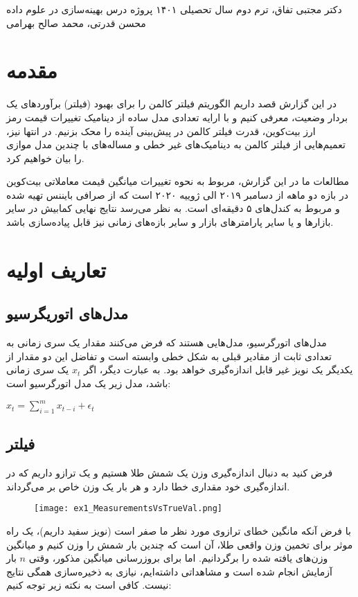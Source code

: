 \documentclass{scribe-cgenomics}
\begin{document}
{دکتر مجتبی تفاق، ترم دوم سال تحصیلی ۱۴۰۱}
{پروژه درس بهینه‌سازی در علوم داده}
{محسن قدرتی، محمد صالح بهرامی}


\section{مقدمه}
در این گزارش قصد داریم الگوریتم فیلتر کالمن را برای بهبود (فیلتر) برآوردهای یک بردار وضعیت، معرفی کنیم و با ارایه تعدادی مدل ساده از دینامیک تغییرات قیمت رمز ارز بیت‌کوین، قدرت فیلتر کالمن در پیش‌بینی آینده را محک بزنیم. در انتها نیز، تعمیم‌هایی از فیلتر کالمن به دینامیک‌های غیر خطی و مساله‌های با چندین مدل موازی را بیان خواهیم کرد. 

مطالعات ما در این گزارش، مربوط به نحوه تغییرات میانگین قیمت معاملاتی بیت‌کوین در بازه دو ماهه از دسامبر ۲۰۱۹ الی ژوییه ۲۰۲۰ است که از صرافی بایننس تهیه شده و مربوط به کندل‌های ۵ دقیقه‌ای است. به نظر می‌رسد نتایج نهایی کمابیش در سایر بازارها و یا سایر پارامترهای بازار و سایر بازه‌های زمانی نیز قابل پیاده‌سازی باشد.

\section{تعاریف اولیه}
\subsection{مدل‌های اتوریگرسیو}
مدل‌های اتورگرسیو، مدل‌هایی هستند که فرض می‌کنند مقدار یک سری زمانی به تعدادی ثابت از مقادیر قبلی به شکل خطی وابسته است و تفاضل این دو مقدار از یکدیگر یک نویز غیر قابل اندازه‌گیری خواهد بود. به عبارت دیگر، اگر
$x_t$
یک سری زمانی باشد، مدل زیر یک مدل اتورگرسیو است:

\begin{center}
$
x_t = \sum_{i = 1}^{m}x_{t-i} + \epsilon_t
$
\end{center}


\subsection{فیلتر}
فرض کنید به دنبال اندازه‌گیری وزن یک شمش طلا هستیم و یک ترازو داریم که در اندازه‌گیری خود مقداری خطا دارد و هر بار یک وزن خاص بر می‌گرداند.

\begin{figure}[h]
\texttt{[image: ex1\_MeasurementsVsTrueVal.png]}
\centering
\end{figure}

با فرض آنکه مانگین خطای ترازوی مورد نظر ما صفر است (نویز سفید داریم)، یک راه موثر برای تخمین وزن واقعی طلا، آن است که چندین بار شمش را وزن کنیم و میانگین وزن‌های یافته شده را برگردانیم. اما برای بروزرسانی میانگین مذکور، وقتی
$n$
بار آزمایش انجام شده است و مشاهداتی داشته‌ایم، نیازی به ذخیره‌سازی همگی نتایج نیست.
کافی است به نکته زیر توجه کنیم:
\end{document}
